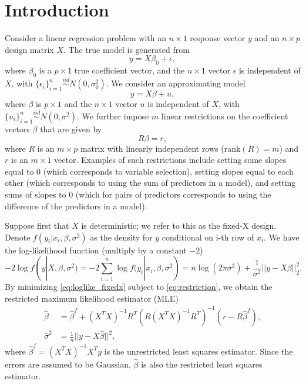 \section{Introduction}
Consider a linear regression problem with an $n\times 1$ response vector $y$ and an $n\times p$ design matrix $X$. The true model is generated from 
\begin{equation}
y=X \beta_0 + \epsilon,
\label{eq:truemodel}
\end{equation}
where $\beta_0$ is a $p \times 1$ true coefficient vector, and the $n \times 1$ vector $\epsilon$ is independent of $X$, with $\{\epsilon_i\}_{i=1}^n \stackrel {iid} {\sim} N(0,\sigma_0^2)$. We consider an approximating model 
\begin{equation*}
y=X \beta + u,
\end{equation*}
where $\beta$ is $p \times 1$ and the $n \times 1$ vector $u$ is independent of $X$, with $\{u_i\}_{i=1}^n \stackrel {iid} {\sim} N(0,\sigma^2)$. We further impose $m$ linear restrictions on the coefficient vectors $\beta$ that are given by
\begin{equation}
  R \beta = r,
  \label{eq:restriction}
\end{equation}
where $R$ is an $m \times p$ matrix with linearly independent rows ($\text{rank}(R)=m$) and $r$ is an $m \times 1$ vector. Examples of such restrictions include setting some slopes equal to 0 (which corresponds to variable selection), setting slopes equal to each other (which corresponds to using the sum of predictors in a model), and setting sums of slopes to 0 (which for pairs of predictors corresponds to using the difference of the predictors in a model).

Suppose first that $X$ is deterministic; we refer to this as the fixed-X design. Denote $f(y_i|x_i,\beta,\sigma^2)$ as the density for $y$ conditional on i-th row of $x_i$. We have the log-likelihood function (multiply by a constant $-2$)
\begin{equation}
-2 \log f(y|X,\beta,\sigma^2) = -2 \sum_{i=1}^n \log f(y_i|x_i,\beta,\sigma^2) = n \log (2\pi \sigma^2) + \frac{1}{\sigma^2} || y-X\beta||_2^2.
\label{eq:loglike_fixedx}
\end{equation}
By minimizing \eqref{eq:loglike_fixedx} subject to \eqref{eq:restriction}, we obtain the restricted maximum likelihood estimator (MLE)
\begin{equation}
\begin{aligned}
\hat{\beta} &= \hat{\beta}^f + (X^T X)^{-1} R^T ( R(X^T X)^{-1} R^T)^{-1} (r-R \hat{\beta}^f),\\ 
\hat \sigma^2 &= \frac{1}{n} ||y-X \hat{\beta}||^2, 
\end{aligned}
\label{eq:betahat_sigmahatsq}
\end{equation}
where $\hat{\beta}^f = (X^T X)^{-1} X^T y$ is the unrestricted least squares estimator. Since the errors are assumed to be Gaussian, $\hat\beta$ is also the restricted least squares estimator. 

